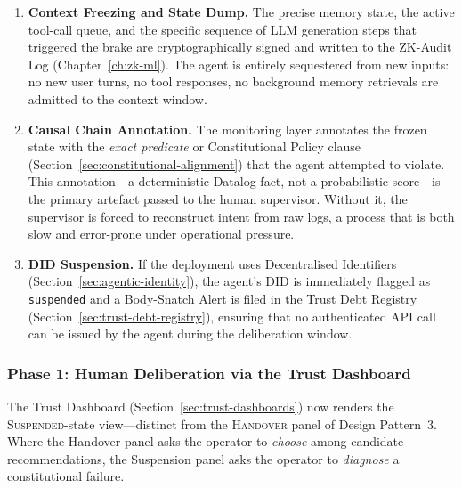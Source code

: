 \begin{enumerate}
  \item \textbf{Context Freezing and State Dump.}
        The precise memory state, the active tool-call queue, and the
        specific sequence of LLM generation steps that triggered the brake
        are cryptographically signed and written to the ZK-Audit Log
        (Chapter~\ref{ch:zk-ml}).  The agent is entirely sequestered from
        new inputs: no new user turns, no tool responses, no background
        memory retrievals are admitted to the context window.

  \item \textbf{Causal Chain Annotation.}
        The monitoring layer annotates the frozen state with the
        \emph{exact predicate} or Constitutional Policy clause
        (Section~\ref{sec:constitutional-alignment}) that the agent
        attempted to violate.  This annotation—a deterministic Datalog
        fact, not a probabilistic score—is the primary artefact passed
        to the human supervisor.  Without it, the supervisor is forced to
        reconstruct intent from raw logs, a process that is both slow and
        error-prone under operational pressure.

  \item \textbf{DID Suspension.}
        If the deployment uses Decentralised Identifiers
        (Section~\ref{sec:agentic-identity}), the agent's DID is
        immediately flagged as \texttt{suspended} and a Body-Snatch Alert
        is filed in the Trust Debt Registry
        (Section~\ref{sec:trust-debt-registry}), ensuring that no
        authenticated API call can be issued by the agent during the
        deliberation window.
\end{enumerate}

\subsubsection*{Phase 1: Human Deliberation via the Trust Dashboard}

The Trust Dashboard (Section~\ref{sec:trust-dashboards}) now renders the
\textsc{Suspended}-state view—distinct from the \textsc{Handover} panel of
Design Pattern~3.  Where the Handover panel asks the operator to
\emph{choose} among candidate recommendations, the Suspension panel asks the
operator to \emph{diagnose} a constitutional failure.

